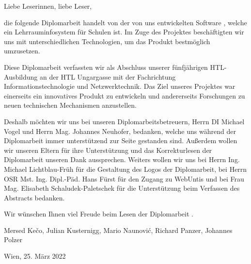 
Liebe Leserinnen, liebe Leser,

die folgende Diplomarbeit handelt von der von uns entwickelten Software \ZELIA, welche ein Lehrrauminfosystem für Schulen ist. Im Zuge des Projektes beschäftigten wir uns mit unterschiedlichen Technologien, um das Produkt bestmöglich umzusetzen.

Diese Diplomarbeit verfassten wir als Abschluss unserer fünfjährigen HTL-Aus\-bildung an der HTL Ungargasse mit der Fachrichtung Informations\-technologie und Netzwerk\-tech\-nik. 
Das Ziel unseres Projektes war einerseits ein innovatives Produkt zu entwickeln und andererseits Forschungen zu neuen technischen Mechanismen anzustellen.

Deshalb möchten wir uns bei unseren Diplomarbeitsbetreuern, Herrn DI Michael Vogel und Herrn Mag. Johannes Neuhofer, bedanken, welche uns während der Diplomarbeit immer unterstützend zur Seite gestanden sind. 
Außerdem wollen wir unseren Eltern für ihre Unterstützung und das Korrekturlesen der Diplomarbeit unseren Dank aussprechen.  
Weiters wollen wir uns bei Herrn Ing. Michael Lichtblau-Früh für die Gestaltung des Logos der Diplomarbeit, bei Herrn OSR Mst. Ing. Dipl.-Päd. Hans Fürst für den Zugang zu WebUntis und bei Frau Mag. Elisabeth Schaludek-Paletschek für die Unterstützung beim Verfassen des Abstracts bedanken.

Wir wünschen Ihnen viel Freude beim Lesen der Diplomarbeit \ZELIA.

Mersed Kečo, Julian Kusternigg, Mario Naunović, Richard Panzer, Johannes Polzer

Wien, 25. März 2022
